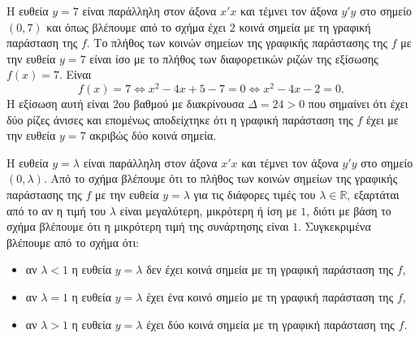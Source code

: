 
\begin{alist}
\item Η ευθεία $y = 7$ είναι παράλληλη στον άξονα $x'x$ και τέμνει τον άξονα $y'y$ στο σημείο $(0,7)$ και όπως βλέπουμε από το σχήμα έχει $2$ κοινά σημεία με τη γραφική παράσταση της $f$.
Το πλήθος των κοινών σημείων της γραφικής παράστασης της $f$ με την ευθεία $y = 7$ είναι ίσο με το πλήθος των διαφορετικών ριζών της εξίσωσης $f(x) = 7$. Είναι
\[f(x) = 7 \Leftrightarrow x^2 - 4x + 5 - 7 = 0 \Leftrightarrow x^2 - 4x - 2 = 0.\]
Η εξίσωση αυτή είναι $2$ου βαθμού με διακρίνουσα $\Delta = 24 > 0$ που σημαίνει ότι έχει δύο ρίζες άνισες και επομένως αποδείχτηκε ότι η γραφική παράσταση της $f$ έχει με την ευθεία $y = 7$ ακριβώς δύο κοινά σημεία.

\item 
\begin{rlist}
\item Η ευθεία $y = \lambda$ είναι παράλληλη στον άξονα $x'x$ και τέμνει τον άξονα $y'y$ στο σημείο $(0, \lambda)$.
Από το σχήμα βλέπουμε ότι το πλήθος των κοινών σημείων της γραφικής παράστασης της $f$ με την ευθεία $y = \lambda$ για τις διάφορες τιμές του $\lambda \in \mathbb{R}$, εξαρτάται από το αν η τιμή του $\lambda$ είναι μεγαλύτερη, μικρότερη ή ίση με $1$, διότι με βάση το σχήμα βλέπουμε ότι η μικρότερη τιμή της συνάρτησης είναι $1$. Συγκεκριμένα βλέπουμε από το σχήμα ότι:
\begin{itemize}
\item αν $\lambda < 1$ η ευθεία $y = \lambda$ δεν έχει κοινά σημεία με τη γραφική παράσταση της $f$,
\item αν $\lambda = 1$ η ευθεία $y = \lambda$ έχει ένα κοινό σημείο με τη γραφική παράσταση της $f$,
\item αν $\lambda > 1$ η ευθεία $y = \lambda$ έχει δύο κοινά σημεία με τη γραφική παράσταση της $f$.
\end{itemize}


\end{rlist}
\end{alist}
